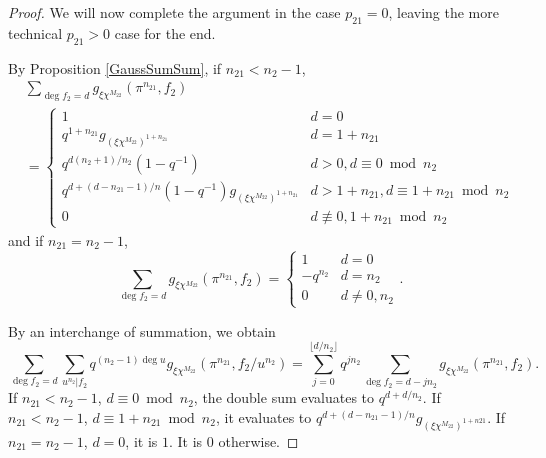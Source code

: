 \documentclass[11pt,letterpaper]{article}
\theoremstyle{definition}
\theoremstyle{remark}
\numberwithin{equation}{section}
\theoremstyle{dotless}
\begin{document}
\begin{proof}
We will now complete the argument in the case $p_{21}=0$, leaving the more technical $p_{21}>0$ case for the end.

By Proposition \ref{GaussSumSum}, if $n_{21}<n_2-1$, 
\begin{equation}
\begin{split}
&\sum_{\deg f_2 = d} g_{\xi \chi^{M_{22}}}(\pi^{n_{21}}, f_2) \\
&= \left\lbrace \begin{array}{cc} 
1 & d=0 \\
q^{1+n_{21}} g_{(\xi \chi^{M_{22}})^{1+n_{21}}} & d = 1+n_{21} \\
q^{d(n_2+1)/n_2}(1-q^{-1}) & d>0, d \equiv 0 \bmod n_2 \\
q^{d+(d-n_{21}-1)/n}(1-q^{-1})g_{(\xi \chi^{M_{22}})^{1+n_{21}}} & d>1+n_{21}, d \equiv 1+n_{21} \bmod n_2 \\
0 & d \not \equiv 0, 1+n_{21} \bmod n_2
\end{array}\right.
\end{split}
\end{equation}
and if $n_{21}=n_2-1$, 
\begin{equation}
\sum_{\deg f_2 = d} g_{\xi \chi^{M_{22}}}(\pi^{n_{21}}, f_2) = \left\lbrace \begin{array}{cc} 
1 & d=0 \\
-q^{n_2} & d = n_2 \\
0 & d \neq 0, n_2
\end{array}\right. .
\end{equation}

By an interchange of summation, we obtain
\begin{equation*}
\sum_{\deg f_2 = d} \sum_{u^{n_2}|f_2} q^{(n_2-1)\deg u} g_{\xi \chi^{M_{22}}}(\pi^{n_{21}}, f_2/u^{n_2}) 
= \sum_{j=0}^{\lfloor d/n_2 \rfloor} q^{j n_2} \sum_{\deg f_2 = d-j n_2} g_{\xi \chi^{M_{22}}}(\pi^{n_{21}}, f_2).
\end{equation*}
If $n_{21}<n_2-1$, $d \equiv 0 \bmod n_2$, the double sum evaluates to $q^{d+d/n_2}$. If $n_{21}<n_2-1$, $d \equiv 1+n_{21} \bmod n_2$, it evaluates to $q^{d+(d-n_{21}-1)/n}g_{(\xi \chi^{M_{22}})^{1+n{21}}}$. If $n_{21}=n_2-1$, $d=0$, it is $1$. It is $0$ otherwise. 


\end{proof}
\end{document}
